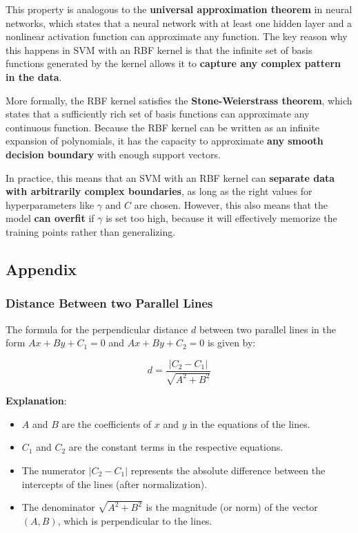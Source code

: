 \documentclass[11pt]{article}
\providecommand{\tightlist}{%
      \setlength{\itemsep}{0pt}\setlength{\parskip}{0pt}}
\begin{document}
This property is analogous to the \textbf{universal approximation
theorem} in neural networks, which states that a neural network with at
least one hidden layer and a nonlinear activation function can
approximate any function. The key reason why this happens in SVM with an
RBF kernel is that the infinite set of basis functions generated by the
kernel allows it to \textbf{capture any complex pattern in the data}.

More formally, the RBF kernel satisfies the \textbf{Stone-Weierstrass
theorem}, which states that a sufficiently rich set of basis functions
can approximate any continuous function. Because the RBF kernel can be
written as an infinite expansion of polynomials, it has the capacity to
approximate \textbf{any smooth decision boundary} with enough support
vectors.

In practice, this means that an SVM with an RBF kernel can
\textbf{separate data with arbitrarily complex boundaries}, as long as
the right values for hyperparameters like $ \gamma $ and $ C $ are
chosen. However, this also means that the model \textbf{can overfit} if
$ \gamma $ is set too high, because it will effectively memorize the
training points rather than generalizing.

    \subsection{Appendix}\label{appendix}

    \subsubsection{Distance Between two Parallel
Lines}\label{distance-between-two-parallel-lines}

The formula for the perpendicular distance $d$ between two parallel
lines in the form $Ax + By + C_1 = 0$ and $Ax + By + C_2 = 0$ is
given by:

$$
d = \frac{|C_2 - C_1|}{\sqrt{A^2 + B^2}}
$$

\textbf{Explanation}:

\begin{itemize}
\tightlist
\item
  $A$ and $B$ are the coefficients of $x$ and $y$ in the
  equations of the lines.
\item
  $C_1$ and $C_2$ are the constant terms in the respective
  equations.
\item
  The numerator $|C_2 - C_1|$ represents the absolute difference
  between the intercepts of the lines (after normalization).
\item
  The denominator $\sqrt{A^2 + B^2}$ is the magnitude (or norm) of the
  vector $(A, B)$, which is perpendicular to the lines.
\end{itemize}
\end{document}

